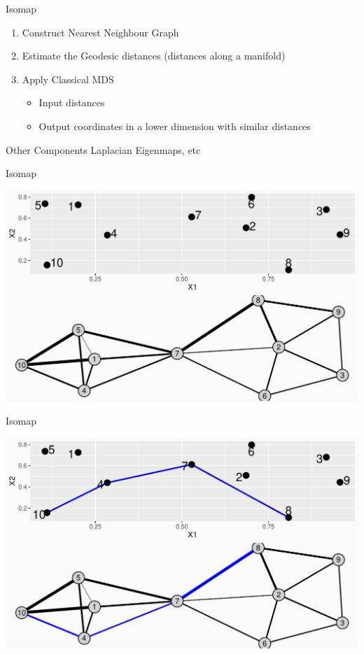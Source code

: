 \documentclass[14pt,ignorenonframetext,]{beamer}
\providecommand{\tightlist}{%
  \setlength{\itemsep}{0pt}\setlength{\parskip}{0pt}}
\begin{document}
\begin{frame}{Isomap}
\protect\hypertarget{isomap}{}
\begin{enumerate}
\tightlist
\item
  Construct Nearest Neighbour Graph
\item
  Estimate the Geodesic distances (distances along a manifold)
\item
  Apply Classical MDS

  \begin{itemize}
  \tightlist
  \item
    Input distances
  \item
    Output coordinates in a lower dimension with similar distances
  \end{itemize}
\end{enumerate}

\begin{block}{Other Components}
\protect\hypertarget{other-components}{}
Laplacian Eigenmaps, etc
\end{block}
\end{frame}

\begin{frame}{Isomap}
\protect\hypertarget{isomap-1}{}
\begin{center}
\includegraphics[width=\linewidth]{plot/p_isomap1}
\end{center}
\end{frame}

\begin{frame}{Isomap}
\protect\hypertarget{isomap-2}{}
\begin{center}
\includegraphics[width=\linewidth]{plot/p_isomap2}
\end{center}
\end{frame}
\end{document}
